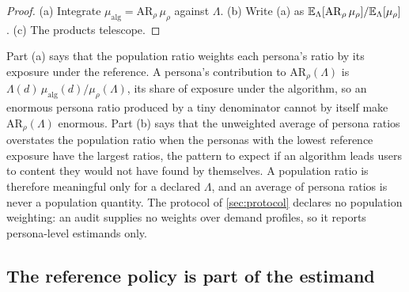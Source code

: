 \begin{proof}
(a) Integrate $\mu_{\mathrm{alg}}=\mathrm{AR}_\rho\,\mu_\rho$ against $\Lambda$. (b) Write (a) as $\mathbb{E}_\Lambda[\mathrm{AR}_\rho\,\mu_\rho]/\mathbb{E}_\Lambda[\mu_\rho]$. (c) The products telescope.
\end{proof}

Part (a) says that the population ratio weights each persona's ratio by its exposure under the reference. A persona's contribution to $\mathrm{AR}_\rho(\Lambda)$ is $\Lambda(d)\,\mu_{\mathrm{alg}}(d)/\mu_\rho(\Lambda)$, its share of exposure under the algorithm, so an enormous persona ratio produced by a tiny denominator cannot by itself make $\mathrm{AR}_\rho(\Lambda)$ enormous. Part (b) says that the unweighted average of persona ratios overstates the population ratio when the personas with the lowest reference exposure have the largest ratios, the pattern to expect if an algorithm leads users to content they would not have found by themselves. A population ratio is therefore meaningful only for a declared $\Lambda$, and an average of persona ratios is never a population quantity. The protocol of \cref{sec:protocol} declares no population weighting: an audit supplies no weights over demand profiles, so it reports persona-level estimands only.

\subsection{The reference policy is part of the estimand}\label{sec:est-reference}

